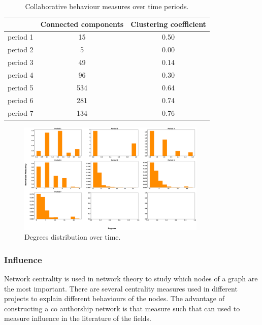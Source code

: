\documentclass{article}
\begin{document}
\begin{table}[!hbtp]
    \begin{center}
    \begin{tabular}{lcc}
        \toprule
                  & \textbf{Connected components} & \textbf{Clustering coefficient}\\
        \midrule
        period 1  & 15                            & 0.50 \\
        period 2  & 5                             & 0.00 \\
        period 3  & 49                            & 0.14 \\
        period 4  & 96                            & 0.30 \\
        period 5  & 534                           & 0.64 \\
        period 6  & 281                           & 0.74 \\
        period 7  & 134                           & 0.76 \\
        \bottomrule
    \end{tabular}
    \end{center}
    \caption{Collaborative behaviour measures over time periods.}
    \label{table:cc_over_time}
\end{table}

\begin{figure}[!hbtp]
    \centering
    \includegraphics[width=0.8\textwidth]{./assets/images/degrees_histrograms_temporal.pdf}
    \caption{Degrees distribution over time.}\label{fig:dist_over_time}
\end{figure}

\subsubsection{Influence}

Network centrality is used in network theory to study which nodes of a graph are
the most important. There are several centrality measures used in different
projects to explain different behaviours of the nodes. The advantage of constructing
a co authorship network is that measure such that can used to
measure influence in the literature of the fields.
\end{document}
